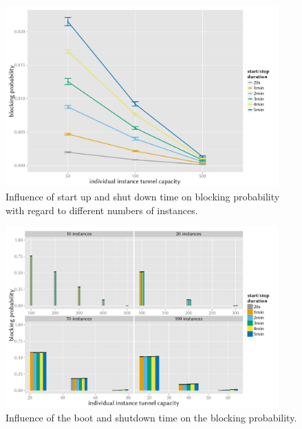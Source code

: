 \documentclass{beamer}
\begin{document}
\begin{frame}
	\frametitle{}
	\begin{figure}
		\includegraphics[height=7cm]{../../chapters/041-mobilenetsmeasuring/images/compare-maxinstances-block.pdf}
		\caption{Influence of start up and shut down time on blocking probability with regard to different numbers of instances.}
	\end{figure}
\end{frame}

\begin{frame}
	\begin{figure}
		\includegraphics[height=7cm]{../../chapters/041-mobilenetsmeasuring/images/R-virtualized-startstop-blocking-barchart.pdf}
		\caption{Influence of the boot and shutdown time on the blocking probability.}
	\end{figure}
\end{frame}
\end{document}
